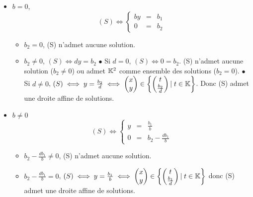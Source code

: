 \documentclass{article}
\renewenvironment{question_kholle}[2][ ]
{
	\subsection{\texorpdfstring{#2}{}}
	\notblank{#1}
	{
		\noindent #1
		\bigbreak
	}
	{}
	\begin{proof}
}
{
	\end{proof}
}
\begin{document}
\begin{question_kholle}
\begin{itemize}[label=$\bullet$ Supposons]
\begin{itemize}[label=$\bullet$ Si]
				\begin{itemize}[label=$\bullet$ Si]
					\item $b = 0$,
					\begin{equation*}
						(S) \iff
						\left\{ \begin{array}{ccc}
							by &=& b_1 \\
							0 &=& b_2
						\end{array} \right.
					\end{equation*}
					\begin{itemize}[label=$\bullet$ Si]
						\item $b_2 = 0$, (S) n'admet aucune solution.
						\item $b_2 \neq 0$, $(S) \iff dy = b_2$
							\subitem$\bullet$ Si $d = 0$, $(S) \iff 0 = b_2$. (S) n'admet aucune solution ($b_2 \neq 0$) ou admet $\mathbb K^2$ comme ensemble des solutions ($b_2 = 0$).
							\subitem$\bullet$ Si $d \neq 0$, $(S) \iff y = \frac{b_2}{d} \iff \begin{pmatrix} x \\ y \end{pmatrix} \in \begin{Bmatrix} \begin{pmatrix} t \\ \frac{b_2}{d} \end{pmatrix} |\; t \in \mathbb K \end{Bmatrix}$. Donc (S) admet une droite affine de solutions.
					\end{itemize}
					\item $b \neq 0$
					\begin{equation*}
						(S) \iff
						\left\{ \begin{array}{ccc}
							y &=& \frac{b_1}{b} \\
							0 &=& b_2 - \frac{db_1}{b}
						\end{array} \right.
					\end{equation*}
					\begin{itemize}[label=$\bullet$ Si]
						\item $b_2 - \frac{db_1}{b} \neq 0$, (S) n'admet aucune solution.
						\item $b_2 - \frac{db_1}{b} = 0$, $(S) \iff y = \frac{b_1}{b} \iff \begin{pmatrix} x \\ y \end{pmatrix} \in \begin{Bmatrix} \begin{pmatrix} t \\ \frac{b_1}{d} \end{pmatrix} |\; t \in \mathbb K \end{Bmatrix}$ donc (S) admet une droite affine de solutions.

\end{itemize}
\end{itemize}
\end{itemize}
\end{itemize}
\end{question_kholle}
\end{document}
